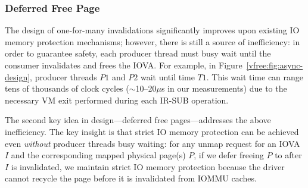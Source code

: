         
    
    


    

\subsubsection{Deferred Free Page}
\label{vfree:ssec:dfp}
The {\vfreename} design of one-for-many invalidations significantly improves upon existing IO memory protection mechanisms; 
    however, there is still a source of inefficiency: in order to guarantee safety, 
    each producer thread must busy wait until the consumer invalidates and frees the IOVA. For example, in Figure~\ref{vfree:fig:async-design}, producer threads $P1$ and $P2$ wait until time $T1$. 
This wait time can range tens of thousands of clock cycles 
({${\sim}$10--20$\mu$s} in our measurements) 
due to the necessary VM exit performed during each IR-SUB operation. 


The second key idea in {\vfreename} design---deferred free pages---addresses the above inefficiency. 
The {key insight} is that strict IO memory protection can be achieved even \emph{without} producer threads busy waiting: 
for any unmap request for an IOVA $I$ and the corresponding mapped physical page(s) $P$, 
    if we defer freeing $P$ to after $I$ is invalidated, 
    we maintain strict IO memory protection
    because the driver cannot recycle the page before it is invalidated from IOMMU caches. %


